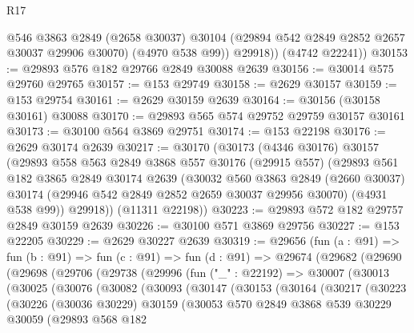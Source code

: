 \begin{lexlean}{R17}
\begin{coremodule}
            @546
            @3863
            @2849
            (@2658 @30037)
            @30104
            (@29894 @542 @2849 @2852 @2657 @30037 @29906 @30070)
            (@4970 @538 @99))
          @29918))
      (@4742 @22241))
@30153 := @29893 @576 @182 @29766 @2849 @30088 @2639
@30156 := @30014 @575 @29760 @29765
@30157 := @153 @29749
@30158 := @2629 @30157
@30159 := @153 @29754
@30161 := @2629 @30159 @2639
@30164 := @30156 (@30158 @30161) @30088
@30170 := @29893 @565 @574 @29752 @29759 @30157 @30161
@30173 := @30100 @564 @3869 @29751
@30174 := @153 @22198
@30176 := @2629 @30174 @2639
@30217 := @30170
    (@30173
      (@4346 @30176)
      @30157
      (@29893
        @558
        @563
        @2849
        @3868
        @557
        @30176
        (@29915 @557)
        (@29893
          @561
          @182
          @3865
          @2849
          @30174
          @2639
          (@30032
            @560
            @3863
            @2849
            (@2660 @30037)
            @30174
            (@29946 @542 @2849 @2852 @2659 @30037 @29956 @30070)
            (@4931 @538 @99))
          @29918))
      (@11311 @22198))
@30223 := @29893 @572 @182 @29757 @2849 @30159 @2639
@30226 := @30100 @571 @3869 @29756
@30227 := @153 @22205
@30229 := @2629 @30227 @2639
@30319 := @29656
    (fun (a : @91) =>
    fun (b : @91) =>
    fun (c : @91) =>
    fun (d : @91) =>
    @29674
      (@29682
        (@29690
          (@29698
            (@29706
              (@29738
                (@29996
                  (fun ("_" : @22192) =>
                  @30007
                    (@30013
                      (@30025
                        (@30076
                          (@30082
                            (@30093
                              (@30147
                                (@30153
                                  (@30164
                                    (@30217
                                      (@30223
                                        (@30226
                                          (@30036 @30229)
                                          @30159
                                          (@30053
                                            @570
                                            @2849
                                            @3868
                                            @539
                                            @30229
                                            @30059
                                            (@29893
                                              @568
                                              @182

\end{coremodule}
\end{lexlean}
